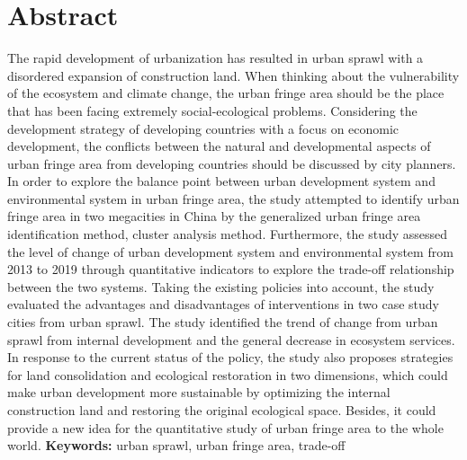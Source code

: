 \documentclass[12pt]{report}
\numberwithin{figure}{section}
\numberwithin{table}{section}
\begin{document}
\newpage
\listoftables 
{} %



\newpage
\chapter*{Abstract} %
The rapid development of urbanization has resulted in urban sprawl with a disordered expansion of construction land. When thinking about the vulnerability of the ecosystem and climate change, the urban fringe area should be the place that has been facing extremely social-ecological problems. Considering the development strategy of developing countries with a focus on economic development, the conflicts between the natural and developmental aspects of urban fringe area from developing countries should be discussed by city planners. In order to explore the balance point between urban development system and environmental system in urban fringe area, the study attempted to identify urban fringe area in two megacities in China by the generalized urban fringe area identification method, cluster analysis method. Furthermore, the study assessed the level of change of urban development system and environmental system from 2013 to 2019 through quantitative indicators to explore the trade-off relationship between the two systems. Taking the existing policies into account, the study evaluated the advantages and disadvantages of interventions in two case study cities from urban sprawl. The study identified the trend of change from urban sprawl from internal development and the general decrease in ecosystem services. In response to the current status of the policy, the study also proposes strategies for land consolidation and ecological restoration in two dimensions, which could make urban development more sustainable by optimizing the internal construction land and restoring the original ecological space. Besides, it could provide a new idea for the quantitative study of urban fringe area to the whole world.
\newline
\newline
\textbf{Keywords:} urban sprawl, urban fringe area, trade-off
\end{document}
